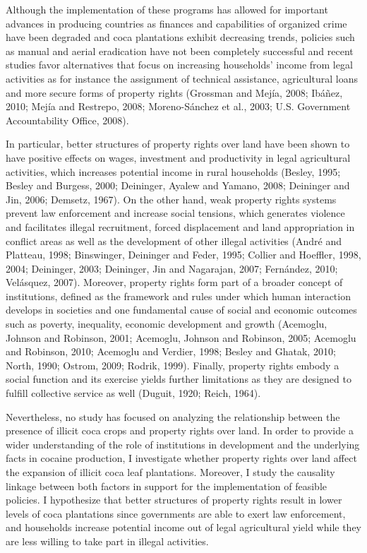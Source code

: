 \documentclass[a4paper, 12pt]{article}
\begin{document}
Although the implementation of these programs has allowed for important advances in producing countries as finances and capabilities of organized crime have been degraded and coca plantations exhibit decreasing trends, policies such as manual and aerial eradication have not been completely successful and recent studies favor alternatives that focus on increasing households' income from legal activities as for instance the assignment of technical assistance, agricultural loans and more secure forms of property rights (Grossman and Mej\'{i}a, 2008; Ib\'{a}\~{n}ez, 2010; Mej\'{i}a and Restrepo, 2008; Moreno-S\'{a}nchez et al., 2003; U.S. Government Accountability Office, 2008).  

In particular, better structures of property rights over land have been shown to have positive effects on wages, investment and productivity in legal agricultural activities, which increases potential income in rural households (Besley, 1995; Besley and Burgess, 2000; Deininger, Ayalew and Yamano, 2008; Deininger and Jin, 2006; Demsetz, 1967). On the other hand, weak property rights systems prevent law enforcement and increase social tensions, which generates violence and facilitates illegal recruitment, forced displacement and land appropriation in conflict areas as well as the development of other illegal activities (Andr\'{e} and Platteau, 1998; Binswinger, Deininger and Feder, 1995; Collier and Hoeffler, 1998, 2004; Deininger, 2003; Deininger, Jin and Nagarajan, 2007; Fern\'{a}ndez, 2010; Vel\'{a}squez, 2007). Moreover, property rights form part of a broader concept of institutions, defined as the framework and rules under which human interaction develops in societies and one fundamental cause of social and economic outcomes such as poverty, inequality, economic development and growth (Acemoglu, Johnson and Robinson, 2001; Acemoglu, Johnson and Robinson, 2005; Acemoglu and Robinson, 2010; Acemoglu and Verdier, 1998; Besley and Ghatak, 2010; North, 1990; Ostrom, 2009; Rodrik, 1999). Finally, property rights embody a social function and its exercise yields further limitations as they are designed to fulfill collective service as well (Duguit, 1920; Reich, 1964).

Nevertheless, no study has focused on analyzing the relationship between the presence of illicit coca crops and property rights over land. In order to provide a wider understanding of the role of institutions in development and the underlying facts in cocaine production, I investigate whether property rights over land affect the expansion of illicit coca leaf plantations. Moreover, I study the causality linkage between both factors in support for the implementation of feasible policies. I hypothesize that better structures of property rights result in lower levels of coca plantations since governments are able to exert law enforcement, and households increase potential income out of legal agricultural yield while they are less willing to take part in illegal activities.
\end{document}
